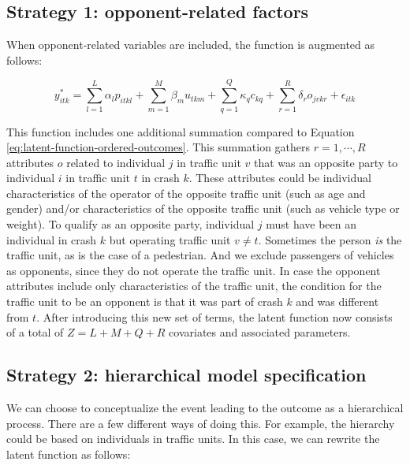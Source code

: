 \documentclass[]{elsarticle} %
\begin{document}
\hypertarget{strategy-1-opponent-related-factors}{%
\subsection{Strategy 1: opponent-related
factors}\label{strategy-1-opponent-related-factors}}

When opponent-related variables are included, the function is augmented
as follows:

\begin{equation}
\label{eq:latent-function-with-opponent-variables}
y_{itk}^*=\sum_{l=1}^L\alpha_lp_{itkl} + \sum_{m=1}^M\beta_mu_{tkm} + \sum_{q=1}^Q\kappa_qc_{kq} + \sum_{r=1}^R\delta_ro_{jvkr} + \epsilon_{itk}
\end{equation}

This function includes one additional summation compared to Equation
\ref{eq:latent-function-ordered-outcomes}. This summation gathers
\(r=1,\cdots,R\) attributes \(o\) related to individual \(j\) in traffic
unit \(v\) that was an opposite party to individual \(i\) in traffic
unit \(t\) in crash \(k\). These attributes could be individual
characteristics of the operator of the opposite traffic unit (such as
age and gender) and/or characteristics of the opposite traffic unit
(such as vehicle type or weight). To qualify as an opposite party,
individual \(j\) must have been an individual in crash \(k\) but
operating traffic unit \(v\ne t\). Sometimes the person \emph{is} the
traffic unit, as is the case of a pedestrian. And we exclude passengers
of vehicles as opponents, since they do not operate the traffic unit. In
case the opponent attributes include only characteristics of the traffic
unit, the condition for the traffic unit to be an opponent is that it
was part of crash \(k\) and was different from \(t\). After introducing
this new set of terms, the latent function now consists of a total of
\(Z=L+M+Q+R\) covariates and associated parameters.

\hypertarget{strategy-2-hierarchical-model-specification}{%
\subsection{Strategy 2: hierarchical model
specification}\label{strategy-2-hierarchical-model-specification}}

We can choose to conceptualize the event leading to the outcome as a
hierarchical process. There are a few different ways of doing this. For
example, the hierarchy could be based on individuals in traffic units.
In this case, we can rewrite the latent function as follows:
\end{document}
